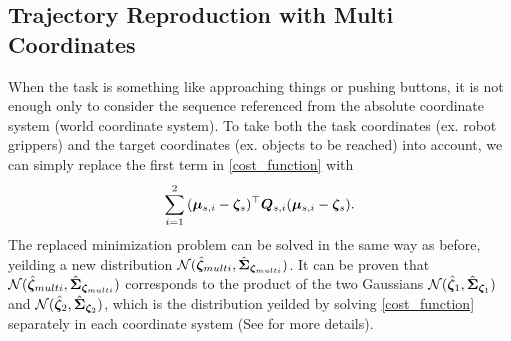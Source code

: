 \subsection{Trajectory Reproduction with Multi Coordinates}
\label{subsection:multi_coordinates}
When the task is something like approaching things or pushing buttons, it is not enough only to consider the sequence referenced from the absolute coordinate system (world coordinate system). To take both the task coordinates (ex. robot grippers) and the target coordinates (ex. objects to be reached) into account, we can simply replace the first term in \eqref{cost_function} with
\begin{align}
  \sum_{i=1}^2 {(\bm{\mu}_{s, i} - \bm{\zeta}_s)^\top \bm{Q}_{s, i} (\bm{\mu}_{s, i} - \bm{\zeta}_s)}. \nonumber
\end{align}
The replaced minimization problem can be solved in the same way as before, yeilding a new distribution \( \mathcal{N}(\hat{\bm{\zeta}}_{multi}, \hat{\bm{\Sigma}}_{{\bm{\zeta}}_{multi}}) \). It can be proven that \( \mathcal{N}(\hat{\bm{\zeta}}_{multi}, \hat{\bm{\Sigma}}_{{\bm{\zeta}}_{multi}}) \) corresponds to the product of the two Gaussians \( \mathcal{N}(\hat{\bm{\zeta}}_{1}, \hat{\bm{\Sigma}}_{{\bm{\zeta}}_{1}}) \) and \( \mathcal{N}(\hat{\bm{\zeta}}_{2}, \hat{\bm{\Sigma}}_{{\bm{\zeta}}_{2}}) \), which is the distribution yeilded by solving \eqref{cost_function} separately in each coordinate system (See \cite{multi_coordinates} for more details).


